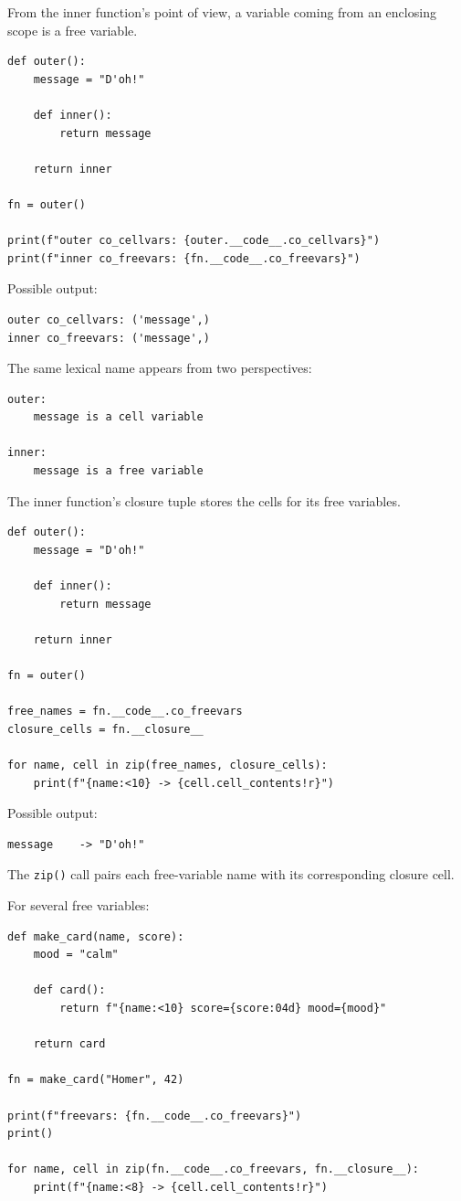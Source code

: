 From the inner function's point of view, a variable coming from an enclosing scope is a free variable.

\begin{verbatim}
def outer():
    message = "D'oh!"

    def inner():
        return message

    return inner

fn = outer()

print(f"outer co_cellvars: {outer.__code__.co_cellvars}")
print(f"inner co_freevars: {fn.__code__.co_freevars}")
\end{verbatim}

Possible output:

\begin{verbatim}
outer co_cellvars: ('message',)
inner co_freevars: ('message',)
\end{verbatim}

The same lexical name appears from two perspectives:

\begin{verbatim}
outer:
    message is a cell variable

inner:
    message is a free variable
\end{verbatim}

The inner function's closure tuple stores the cells for its free variables.

\begin{verbatim}
def outer():
    message = "D'oh!"

    def inner():
        return message

    return inner

fn = outer()

free_names = fn.__code__.co_freevars
closure_cells = fn.__closure__

for name, cell in zip(free_names, closure_cells):
    print(f"{name:<10} -> {cell.cell_contents!r}")
\end{verbatim}

Possible output:

\begin{verbatim}
message    -> "D'oh!"
\end{verbatim}

The \texttt{zip()} call pairs each free-variable name with its corresponding closure cell.

For several free variables:

\begin{verbatim}
def make_card(name, score):
    mood = "calm"

    def card():
        return f"{name:<10} score={score:04d} mood={mood}"

    return card

fn = make_card("Homer", 42)

print(f"freevars: {fn.__code__.co_freevars}")
print()

for name, cell in zip(fn.__code__.co_freevars, fn.__closure__):
    print(f"{name:<8} -> {cell.cell_contents!r}")
\end{verbatim}

